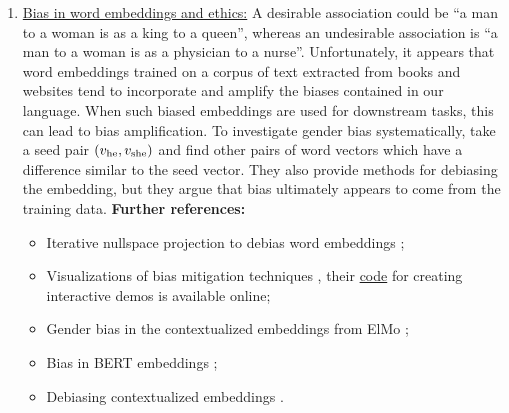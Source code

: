 \documentclass[11pt, a4paper]{amsart}
\begin{document}
\begin{enumerate}[resume]
    \item \underline{Bias in word embeddings and ethics:}
    \newline
    A desirable association could be ``a man to a woman is as a king to a queen'', whereas an undesirable association is ``a man to a woman is as a physician to a nurse''.
    Unfortunately, it appears that word embeddings trained on a corpus of text extracted from books and websites tend to incorporate and amplify the biases contained in our language.
    When such biased embeddings are used for downstream tasks, this can lead to bias amplification.
    To investigate gender bias systematically, \cite{DBLP:journals/corr/BolukbasiCZSK16a} take a seed pair $(v_\textup{he}, v_\textup{she})$ and find other pairs of word vectors which have a difference similar to the seed vector.
    They also provide methods for debiasing the embedding, but they argue that bias ultimately appears to come from the training data.
    \newline
    \textbf{Further references:}
    \begin{itemize}
        \item Iterative nullspace projection to debias word embeddings \cite{ravfogel-etal-2020-null};
        \item Visualizations of bias mitigation techniques \cite{DBLP:journals/corr/abs-2104-02797},
        their \href{https://github.com/tdavislab/verb}{code} for creating interactive demos is available online;
        \item Gender bias in the contextualized embeddings from ElMo \cite{zhao-etal-2019-gender};
        \item Bias in BERT embeddings \cite{kurita-etal-2019-measuring};
        \item Debiasing contextualized embeddings \cite{kaneko-bollegala-2021-debiasing}.
    \end{itemize}
    
    


\end{enumerate}
\end{document}
